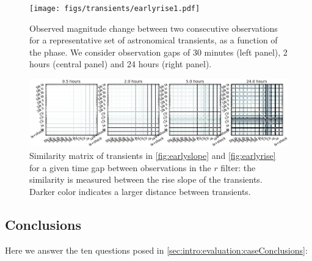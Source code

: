 \begin{figure}[hbt]
\centerline{
\texttt{[image: figs/transients/earlyrise1.pdf]}
}
\caption{Observed magnitude change between two consecutive observations for a representative set of astronomical transients, as a function of the phase. We consider observation gaps of 30 minutes  (left panel), 2 hours (central panel) and 24 hours (right panel).
}
\label{fig:earlyrise}
\end{figure}
\begin{figure}[hbt]
\centerline{
\includegraphics[width=\textwidth]{figs/transients/TransientsAgeSimilarity.png}
}
\caption{Similarity matrix of transients in \autoref{fig:earlyslope} and \autoref{fig:earlyrise} for a given time gap between observations in the $r$ filter: the similarity is measured between the rise slope of the transients. Darker color indicates a larger distance between transients.
}
\label{fig:simmatrix}
\end{figure}


 \subsection{Conclusions}

 Here we answer the ten questions posed in
 \autoref{sec:intro:evaluation:caseConclusions}:

